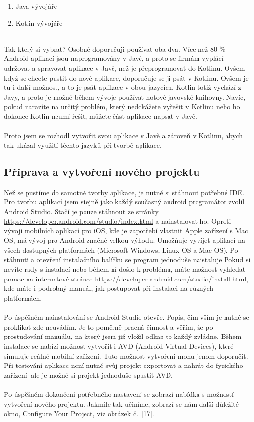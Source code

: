 \documentclass{vskpou} %
\begin{document}
\begin{enumerate}
\item {Java vývojáře}

\item {Kotlin vývojáře} 

\end{enumerate}
\\
Tak který si vybrat? Osobně doporučuji používat oba dva. Více než 80 \% Android aplikací jsou naprogramovány v Javě, a proto se firmám vyplácí udržovat a spravovat aplikace v Javě, než je přeprogramovat do Kotlinu. Ovšem když se chcete pustit do nové aplikace, doporučuje se ji psát v Kotlinu. Ovšem je tu i další možnost, a to je psát aplikace v obou jazycích. Kotlin totiž vychází z Javy, a proto je možné během vývoje používat hotové javovské knihovny. Navíc, pokud narazíte na určitý problém, který nedokážete vyřešit v Kotlinu nebo ho dokonce Kotlin neumí řešit, můžete část aplikace napsat v Javě.\\\\ Proto jsem se rozhodl vytvořit svou aplikace v Javě a zároveň v Kotlinu, abych tak ukázal využití těchto jazyků při tvorbě aplikace.\\

\newpage
\subsection{Příprava a vytvoření nového projektu}
Než se pustíme do samotné tvorby aplikace, je nutné si stáhnout potřebné IDE. Pro tvorbu aplikací jsem stejně jako každý současný android programátor zvolil Android Studio. Stačí je pouze stáhnout ze stránky \url{https://developer.android.com/studio/index.html} a nainstalovat ho. Oproti vývoji mobilních aplikací pro iOS, kde je zapotřebí vlastnit Apple zařízení s Mac OS, má vývoj pro Android značně velkou výhodu. Umožňuje vyvíjet aplikací na všech dostupných platformách (Microsoft Windows, Linux OS a Mac OS). Po stáhnutí a otevření instalačního balíčku se program jednoduše naistaluje Pokud si nevíte rady s instalací nebo během ní došlo k problému, máte možnost vyhledat pomoc na internetové stránce \url{https://developer.android.com/studio/install.html}, kde máte i podrobný manuál, jak postupovat při instalaci na různých platformách.\\
\\
Po úspěšném nainstalování se Android Studio otevře. Popis, čím vším je nutné se proklikat zde neuvádím. Je to poměrně pracná činnost a věřím, že po prostudování manuálu, na který jsem již vložil odkaz to každý zvládne. Během instalace se nabízí možnost vytvořit i AVD (Android Virtual Devices), které simuluje reálné mobilní zařízení. Tuto možnost vytvoření mohu jenom doporučit. Při testování aplikace není nutné svůj projekt exportovat a nahrát do fyzického zařízení, ale je možné si projekt jednoduše spustit AVD.\\
\\
Po úspěšném dokončení potřebného nastavení se zobrazí nabídka s možností vytvoření nového projektu. Jakmile tak učiníme, zobrazí se nám další důležité okno, Configure Your Project, viz obrázek č.~\ref{17}.
\end{document}
